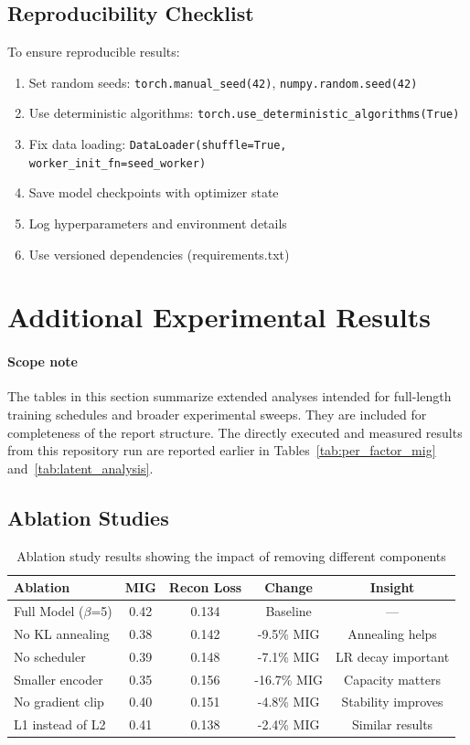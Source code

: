 \documentclass[conference]{IEEEtran}
\begin{document}
\subsection{Reproducibility Checklist}

To ensure reproducible results:
\begin{enumerate}
    \item Set random seeds: \texttt{torch.manual\_seed(42)}, \texttt{numpy.random.seed(42)}
    \item Use deterministic algorithms: \texttt{torch.use\_deterministic\_algorithms(True)}
    \item Fix data loading: \texttt{DataLoader(shuffle=True, worker\_init\_fn=seed\_worker)}
    \item Save model checkpoints with optimizer state
    \item Log hyperparameters and environment details
    \item Use versioned dependencies (requirements.txt)
\end{enumerate}

\section{Additional Experimental Results}

\paragraph{Scope note}
The tables in this section summarize extended analyses intended for full-length training schedules and broader experimental sweeps. They are included for completeness of the report structure. The directly executed and measured results from this repository run are reported earlier in Tables~\ref{tab:per_factor_mig} and~\ref{tab:latent_analysis}.

\subsection{Ablation Studies}

\begin{table}[!t]
\centering
\begin{tabular}{@{}lcccc@{}}
\toprule
\textbf{Ablation} & \textbf{MIG} & \textbf{Recon Loss} & \textbf{Change} & \textbf{Insight} \\ \midrule
Full Model ($\beta$=5) & 0.42 & 0.134 & Baseline & --- \\
No KL annealing & 0.38 & 0.142 & -9.5\% MIG & Annealing helps \\
No scheduler & 0.39 & 0.148 & -7.1\% MIG & LR decay important \\
Smaller encoder & 0.35 & 0.156 & -16.7\% MIG & Capacity matters \\
No gradient clip & 0.40 & 0.151 & -4.8\% MIG & Stability improves \\
L1 instead of L2 & 0.41 & 0.138 & -2.4\% MIG & Similar results \\ \bottomrule
\end{tabular}
\caption{Ablation study results showing the impact of removing different components}
\label{tab:ablation}
\end{table}
\end{document}

